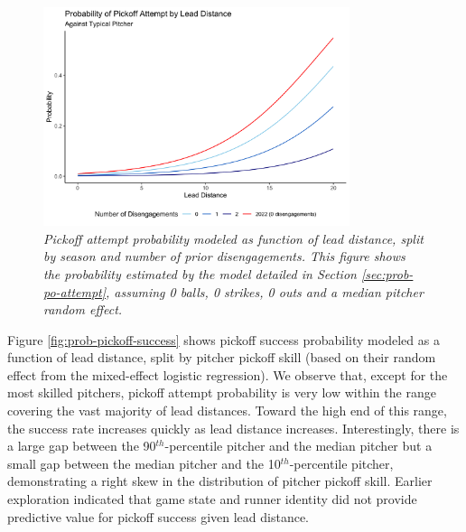 \documentclass{article}
\begin{document}
      \begin{figure}
        \centering
        \includegraphics[width = 0.8\textwidth]{../../output/figures/prob_pickoff_attempt.png}
        \caption{
          \it Pickoff attempt probability modeled as function of lead distance, split by season and number of prior disengagements. This figure shows the probability estimated by the model detailed in Section \ref{sec:prob-po-attempt}, assuming 0 balls, 0 strikes, 0 outs and a median pitcher random effect.
        }
        \label{fig:prob-pickoff-attempt}
      \end{figure}
      
      Figure \ref{fig:prob-pickoff-success} shows pickoff success probability modeled as a function of lead distance, split by pitcher pickoff skill (based on their random effect from the mixed-effect logistic regression). We observe that, except for the most skilled pitchers, pickoff attempt probability is very low within the range covering the vast majority of lead distances. Toward the high end of this range, the success rate increases quickly as lead distance increases. Interestingly, there is a large gap between the 90$^{th}$-percentile pitcher and the median pitcher but a small gap between the median pitcher and the 10$^{th}$-percentile pitcher, demonstrating a right skew in the distribution of pitcher pickoff skill. Earlier exploration indicated that game state and runner identity did not provide predictive value for pickoff success given lead distance.
  
\end{document}
